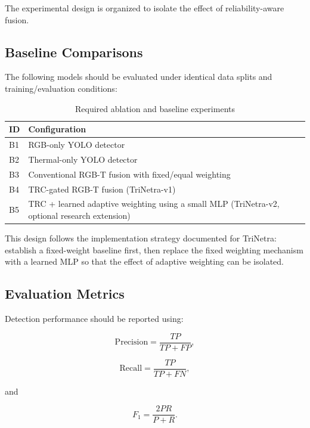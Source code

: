 \documentclass[conference]{IEEEtran}
\begin{document}
The experimental design is organized to isolate the effect of reliability-aware fusion.

\subsection{Baseline Comparisons}

The following models should be evaluated under identical data splits and training/evaluation conditions:

\begin{table}[!t]
\centering
\caption{Required ablation and baseline experiments}
\label{tab:ablations}
\footnotesize
\begin{tabular}{p{}p{}}
\toprule
\textbf{ID} & \textbf{Configuration}\\
\midrule
B1 & RGB-only YOLO detector\\
B2 & Thermal-only YOLO detector\\
B3 & Conventional RGB-T fusion with fixed/equal weighting\\
B4 & TRC-gated RGB-T fusion (TriNetra-v1)\\
B5 & TRC + learned adaptive weighting using a small MLP (TriNetra-v2, optional research extension)\\
\bottomrule
\end{tabular}
\end{table}

This design follows the implementation strategy documented for TriNetra: establish a fixed-weight baseline first, then replace the fixed weighting mechanism with a learned MLP so that the effect of adaptive weighting can be isolated.

\subsection{Evaluation Metrics}

Detection performance should be reported using:

\begin{equation}
\mathrm{Precision}=\frac{TP}{TP+FP},
\end{equation}

\begin{equation}
\mathrm{Recall}=\frac{TP}{TP+FN},
\end{equation}

and

\begin{equation}
F_1=\frac{2PR}{P+R}.
\end{equation}
\end{document}
